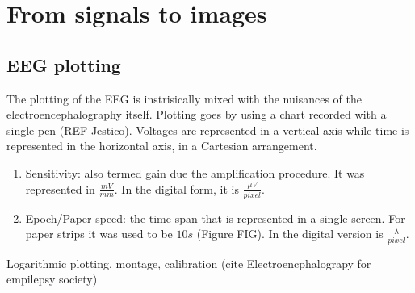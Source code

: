 \chapter{From signals to images}



\section{EEG plotting}

The plotting of the EEG is instrisically mixed with the nuisances of the electroencephalography itself.  Plotting goes by using a chart recorded with a single pen (REF Jestico).   Voltages are represented in a vertical axis while time is represented in the horizontal axis, in a Cartesian arrangement. 

\begin{enumerate}
\item Sensitivity: also termed gain due the amplification procedure.  It was represented in $ \frac{mV}{mm}$.  In the digital form, it is $\frac{\mu V}{pixel}$.
\item Epoch/Paper speed: the time span that is represented in a single screen.  For paper strips it was used to be $10s$ (Figure FIG).  In the digital version is $ \frac{\lambda}{pixel}$.
\end{enumerate}

Logarithmic plotting, montage, calibration (cite Electroencphalograpy for empilepsy society)


